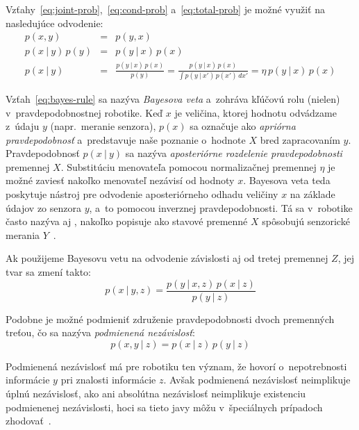       Vzťahy~\ref{eq:joint-prob},~\ref{eq:cond-prob} a~\ref{eq:total-prob} je možné využiť na nasledujúce odvodenie:
      \begin{eqnarray}
        p(x,y) &=& p(y,x) \nonumber \\
        p(x\ |\ y)\, p(y) &=& p(y\ |\ x)\, p(x) \nonumber \\
        p(x\ |\ y) &=& \frac{p(y\ |\ x)\, p(x)}{p(y)} = \frac{p(y\ |\ x)\, p(x)}{\int p(y\ |\ x')\, p(x')\, dx'} = \eta\, p(y\ |\ x)\, p(x) \label{eq:bayes-rule}
      \end{eqnarray}

      Vzťah~\ref{eq:bayes-rule} sa nazýva \emph{Bayesova veta} a~zohráva kľúčovú rolu (nielen) v~pravdepodobnostnej robotike. Keď $x$ je veličina, ktorej hodnotu odvádzame z~údaju $y$ (napr.\ meranie senzora), $p(x)$ sa označuje ako \emph{apriórna pravdepodobnosť} a~predstavuje naše poznanie o~hodnote $X$ bred zapracovaním $y$. Pravdepodobnosť $p(x\ |\ y)$ sa nazýva \emph{aposteriórne rozdelenie pravdepodobnosti} premennej $X$. Substitúciu menovateľa pomocou normalizačnej premennej $\eta$ je možné zaviesť nakoľko menovateľ nezávisí od hodnoty $x$. Bayesova veta teda poskytuje nástroj pre odvodenie aposteriórneho odhadu veličiny $x$ na základe údajov zo senzora $y$, a~to pomocou inverznej pravdepodobnosti. Tá sa v~robotike často nazýva aj , nakoľko popisuje ako stavové premenné $X$ spôsobujú senzorické merania $Y$~\cite{thrunProbabilisticRobotics2005}.

      Ak použijeme Bayesovu vetu na odvodenie závislosti aj od tretej premennej $Z$, jej tvar sa zmení takto:
      \begin{equation}
        p(x\ |\ y, z) = \frac{p(y\ |\ x, z)\, p(x\ |\ z)}{p(y\ |\ z)}
      \end{equation}

      Podobne je možné podmieniť združenie pravdepodobnosti dvoch premenných treťou, čo sa nazýva \emph{podmienená nezávislosť}:
      \begin{equation}
        p(x, y\ |\ z) = p(x\ |\ z)\, p(y\ |\ z)
      \end{equation}

      Podmienená nezávislosť má pre robotiku ten význam, že hovorí o~nepotrebnosti informácie $y$ pri znalosti informácie $z$. Avšak podmienená nezávislosť neimplikuje úplnú nezávislosť, ako ani absolútna nezávislosť neimplikuje existenciu podmienenej nezávislosti, hoci sa  tieto javy môžu v~špeciálnych prípadoch zhodovať~\cite{thrunProbabilisticRobotics2005}.


